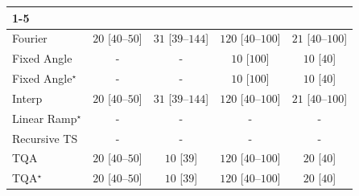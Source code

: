 \begin{tabular}{l|cccc|}
\cline{1-5}
\multicolumn{5}{c}{\rule{0pt}{8pt}PP} \\
\midrule
Fourier & {\cellcolor[HTML]{F5FBF3}} \color[HTML]{000000} $20$ [$40$--$50$] & {\cellcolor[HTML]{F2FAF0}} \color[HTML]{000000} $31$ [$39$--$144$] & {\cellcolor[HTML]{DCF2D7}} \color[HTML]{000000} $120$ [$40$--$100$] & {\cellcolor[HTML]{F5FBF2}} \color[HTML]{000000} $21$ [$40$--$100$] \\
Fixed Angle & {\cellcolor[HTML]{000000}} \color[HTML]{F1F1F1} {\cellcolor{white}} \color{black} - & {\cellcolor[HTML]{000000}} \color[HTML]{F1F1F1} {\cellcolor{white}} \color{black} - & {\cellcolor[HTML]{F7FCF5}} \color[HTML]{000000} $10$ [$100$] & {\cellcolor[HTML]{F7FCF5}} \color[HTML]{000000} $10$ [$40$] \\
Fixed Angle$^\star$ & {\cellcolor[HTML]{000000}} \color[HTML]{F1F1F1} {\cellcolor{white}} \color{black} - & {\cellcolor[HTML]{000000}} \color[HTML]{F1F1F1} {\cellcolor{white}} \color{black} - & {\cellcolor[HTML]{F7FCF5}} \color[HTML]{000000} $10$ [$100$] & {\cellcolor[HTML]{F7FCF5}} \color[HTML]{000000} $10$ [$40$] \\
Interp & {\cellcolor[HTML]{F5FBF3}} \color[HTML]{000000} $20$ [$40$--$50$] & {\cellcolor[HTML]{F2FAF0}} \color[HTML]{000000} $31$ [$39$--$144$] & {\cellcolor[HTML]{DCF2D7}} \color[HTML]{000000} $120$ [$40$--$100$] & {\cellcolor[HTML]{F5FBF2}} \color[HTML]{000000} $21$ [$40$--$100$] \\
Linear Ramp$^\star$ & {\cellcolor[HTML]{000000}} \color[HTML]{F1F1F1} {\cellcolor{white}} \color{black} - & {\cellcolor[HTML]{000000}} \color[HTML]{F1F1F1} {\cellcolor{white}} \color{black} - & {\cellcolor[HTML]{000000}} \color[HTML]{F1F1F1} {\cellcolor{white}} \color{black} - & {\cellcolor[HTML]{000000}} \color[HTML]{F1F1F1} {\cellcolor{white}} \color{black} - \\
Recursive TS & {\cellcolor[HTML]{000000}} \color[HTML]{F1F1F1} {\cellcolor{white}} \color{black} - & {\cellcolor[HTML]{000000}} \color[HTML]{F1F1F1} {\cellcolor{white}} \color{black} - & {\cellcolor[HTML]{000000}} \color[HTML]{F1F1F1} {\cellcolor{white}} \color{black} - & {\cellcolor[HTML]{000000}} \color[HTML]{F1F1F1} {\cellcolor{white}} \color{black} - \\
TQA & {\cellcolor[HTML]{F5FBF3}} \color[HTML]{000000} $20$ [$40$--$50$] & {\cellcolor[HTML]{F7FCF5}} \color[HTML]{000000} $10$ [$39$] & {\cellcolor[HTML]{DCF2D7}} \color[HTML]{000000} $120$ [$40$--$100$] & {\cellcolor[HTML]{F5FBF3}} \color[HTML]{000000} $20$ [$40$] \\
TQA$^\star$ & {\cellcolor[HTML]{F5FBF3}} \color[HTML]{000000} $20$ [$40$--$50$] & {\cellcolor[HTML]{F7FCF5}} \color[HTML]{000000} $10$ [$39$] & {\cellcolor[HTML]{DCF2D7}} \color[HTML]{000000} $120$ [$40$--$100$] & {\cellcolor[HTML]{F5FBF3}} \color[HTML]{000000} $20$ [$40$] \\

\end{tabular}
